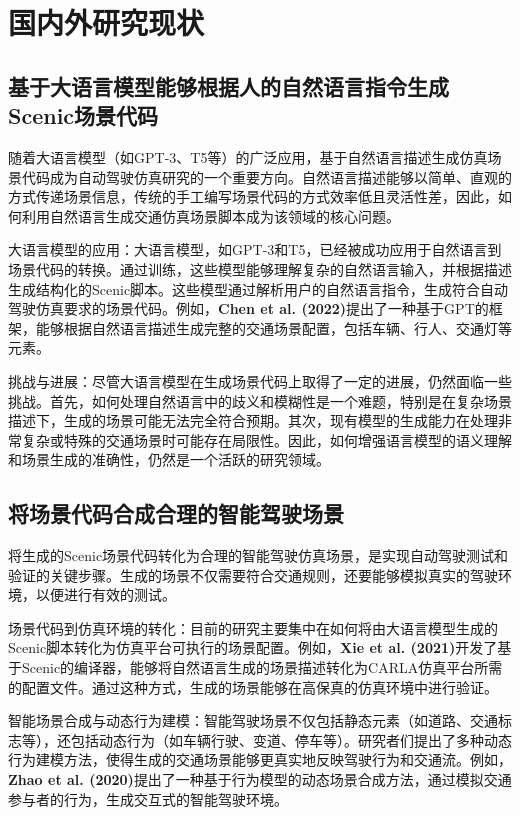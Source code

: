 	
\section{国内外研究现状}
\subsection{基于大语言模型能够根据人的自然语言指令生成Scenic场景代码}
	随着大语言模型（如GPT-3、T5等）的广泛应用，基于自然语言描述生成仿真场景代码成为自动驾驶仿真研究的一个重要方向。自然语言描述能够以简单、直观的方式传递场景信息，传统的手工编写场景代码的方式效率低且灵活性差，因此，如何利用自然语言生成交通仿真场景脚本成为该领域的核心问题。
	
	大语言模型的应用：大语言模型，如GPT-3和T5，已经被成功应用于自然语言到场景代码的转换。通过训练，这些模型能够理解复杂的自然语言输入，并根据描述生成结构化的Scenic脚本。这些模型通过解析用户的自然语言指令，生成符合自动驾驶仿真要求的场景代码。例如，\textbf{Chen et al. (2022)}提出了一种基于GPT的框架，能够根据自然语言描述生成完整的交通场景配置，包括车辆、行人、交通灯等元素。
	
	挑战与进展：尽管大语言模型在生成场景代码上取得了一定的进展，仍然面临一些挑战。首先，如何处理自然语言中的歧义和模糊性是一个难题，特别是在复杂场景描述下，生成的场景可能无法完全符合预期。其次，现有模型的生成能力在处理非常复杂或特殊的交通场景时可能存在局限性。因此，如何增强语言模型的语义理解和场景生成的准确性，仍然是一个活跃的研究领域。
	
	\subsection{将场景代码合成合理的智能驾驶场景}
	将生成的Scenic场景代码转化为合理的智能驾驶仿真场景，是实现自动驾驶测试和验证的关键步骤。生成的场景不仅需要符合交通规则，还要能够模拟真实的驾驶环境，以便进行有效的测试。
	
	场景代码到仿真环境的转化：目前的研究主要集中在如何将由大语言模型生成的Scenic脚本转化为仿真平台可执行的场景配置。例如，\textbf{Xie et al. (2021)}开发了基于Scenic的编译器，能够将自然语言生成的场景描述转化为CARLA仿真平台所需的配置文件。通过这种方式，生成的场景能够在高保真的仿真环境中进行验证。
	
	智能场景合成与动态行为建模：智能驾驶场景不仅包括静态元素（如道路、交通标志等），还包括动态行为（如车辆行驶、变道、停车等）。研究者们提出了多种动态行为建模方法，使得生成的交通场景能够更真实地反映驾驶行为和交通流。例如，\textbf{Zhao et al. (2020)}提出了一种基于行为模型的动态场景合成方法，通过模拟交通参与者的行为，生成交互式的智能驾驶环境。
	
